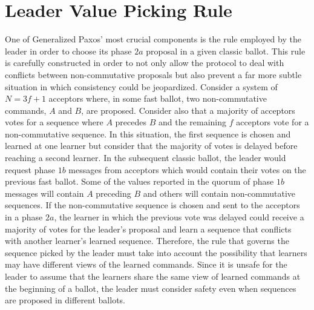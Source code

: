 \section{Leader Value Picking Rule} \label{value_picking}

One of Generalized Paxos' most crucial components is the rule employed by the leader in order to choose its phase $2a$ proposal in a given classic ballot. This rule is carefully constructed in order to not only allow the protocol to deal with conflicts between non-commutative proposals but also prevent a far more subtle situation in which consistency could be jeopardized. Consider a system of $N=3f+1$ acceptors where, in some fast ballot, two non-commutative commands, $A$ and $B$, are proposed. Consider also that a majority of acceptors votes for a sequence where $A$ precedes $B$ and the remaining $f$ acceptors vote for a non-commutative sequence. In this situation, the first sequence is chosen and learned at one learner but consider that the majority of votes is delayed before reaching a second learner. In the subsequent classic ballot, the leader would request phase $1b$ messages from acceptors which would contain their votes on the previous fast ballot. Some of the values reported in the quorum of phase $1b$ messages will contain $A$ preceding $B$ and others will contain non-commutative sequences. If the non-commutative sequence is chosen and sent to the acceptors in a phase $2a$, the learner in which the previous vote was delayed could receive a majority of votes for the leader's proposal and learn a sequence that conflicts with another learner's learned sequence. Therefore, the rule that governs the sequence picked by the leader must take into account the possibility that learners may have different views of the learned commands. Since it is unsafe for the leader to assume that the learners share the same view of learned commands at the beginning of a ballot, the leader must consider safety even when sequences are proposed in different ballots. \par
